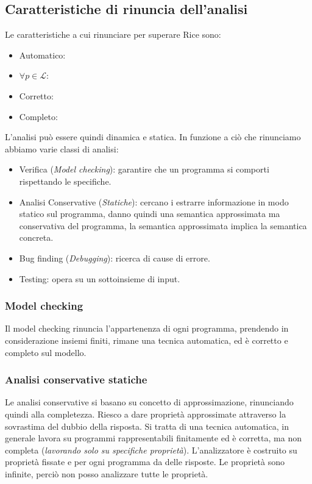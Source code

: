 \subsection{Caratteristiche di rinuncia dell'analisi}
Le caratteristiche a cui rinunciare per superare Rice sono:
\begin{itemize}
    \item Automatico:
    \item $\forall p \in \mathcal{L}$:
    \item Corretto:
    \item Completo:
\end{itemize}
L'analisi può essere quindi dinamica e statica.
In funzione a ciò che rinunciamo abbiamo varie classi di analisi:
\begin{itemize}
    \item Verifica (\textit{Model checking}): garantire che un programma si comporti rispettando le specifiche.
    \item Analisi Conservative (\textit{Statiche}): cercano i estrarre informazione 
    in modo statico sul programma, danno quindi una semantica approssimata ma conservativa del 
    programma, la semantica approssimata implica la semantica concreta.
    \item Bug finding (\textit{Debugging}): ricerca di cause di errore.
    \item Testing: opera su un sottoinsieme di input.
\end{itemize}
\subsubsection{Model checking}
Il model checking rinuncia l'appartenenza di ogni programma, prendendo in considerazione insiemi 
finiti, rimane una tecnica automatica, ed è corretto e completo sul modello.
\subsubsection{Analisi conservative statiche}
Le analisi conservative si basano su concetto di approssimazione, rinunciando quindi 
alla completezza. Riesco a dare proprietà approssimate attraverso la sovrastima del dubbio della risposta.
Si tratta di una tecnica automatica, in generale lavora su programmi rappresentabili finitamente ed
è corretta, ma non completa (\textit{lavorando solo su specifiche proprietà}).
L'analizzatore è costruito su proprietà fissate e per ogni programma da delle risposte. 
Le proprietà sono infinite, perciò non posso analizzare tutte le proprietà.
